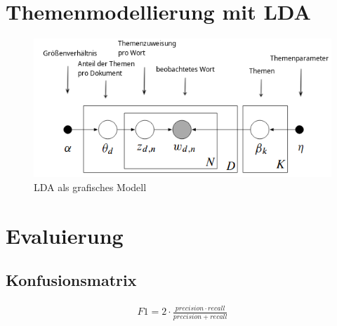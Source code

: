 \lipsum[3]

\section{Themenmodellierung mit LDA}
\label{subsec:themenmodellierung}

\lipsum[3]

\begin{figure}[!ht]
    \centering
    \includegraphics[width=0.9\linewidth]{media/LDA_selbst.png}
    \caption[LDA als grafisches Model mit eigenen Beschriftungen]{LDA als grafisches Modell}
    \label{fig:lda}
\end{figure}

\lipsum[3]

\section{Evaluierung}
\label{sec:evaluierng}

\lipsum[3]

\subsection{Konfusionsmatrix}
\label{sec:konfusionsmatrix}

\lipsum[3]

\begin{table}[!ht]
    \centering
    \begin{adjustbox}{width=0.65\columnwidth, center}
    \end{adjustbox}
    \caption{Konfusionsmatrix}
    \label{tab:confusionmatrix}
\end{table}

\lipsum[3]

\begin{eqnarray}
    F1 = 2\cdot \frac{precision\cdot recall}{precision+ recall}
\end{eqnarray}
